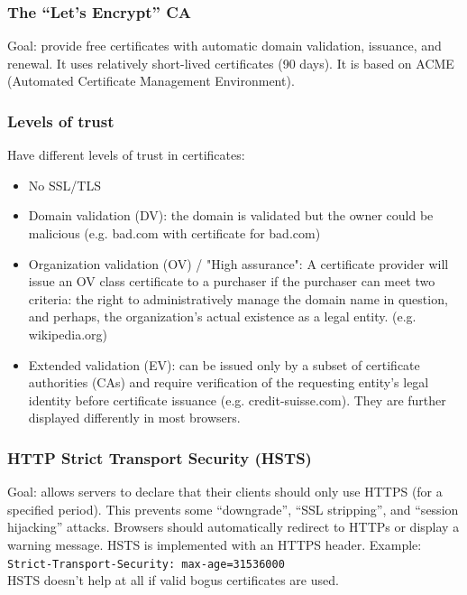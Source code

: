 \documentclass[11pt,oneside,a4paper]{article}
\begin{document}
\subsubsection{The “Let’s Encrypt” CA}

Goal: provide free certificates with automatic domain validation, issuance, and renewal. It uses relatively short-lived certificates (90 days). It is based on ACME (Automated Certificate Management Environment).

\subsubsection{Levels of trust}

Have different levels of trust in certificates:

\vspace{-\topsep}
\begin{itemize}
	\setlength{\itemsep}{0pt}
	\setlength{\parskip}{0pt}
	\item No SSL/TLS
	\item Domain validation (DV): the domain is validated but the owner could be malicious (e.g. bad.com with certificate for bad.com)
	\item Organization validation (OV) / "High assurance": A certificate provider will issue an OV class certificate to a purchaser if the purchaser can meet two criteria: the right to administratively manage the domain name in question, and perhaps, the organization's actual existence as a legal entity. (e.g. wikipedia.org)
	\item Extended validation (EV): can be issued only by a subset of certificate authorities (CAs) and require verification of the requesting entity's legal identity before certificate issuance (e.g. credit-suisse.com). They are further displayed differently in most browsers. 
\end{itemize}
\vspace{-\topsep}

\subsubsection{HTTP Strict Transport Security (HSTS)}

Goal: allows servers to declare that their clients should only use HTTPS (for a specified period). This prevents some “downgrade”, “SSL stripping”, and “session hijacking” attacks. Browsers should automatically redirect to HTTPs or display a warning message. HSTS is implemented with an HTTPS header. Example: \texttt{Strict-Transport-Security: max-age=31536000}\\
HSTS doesn't help at all if valid bogus certificates are used.
\end{document}
